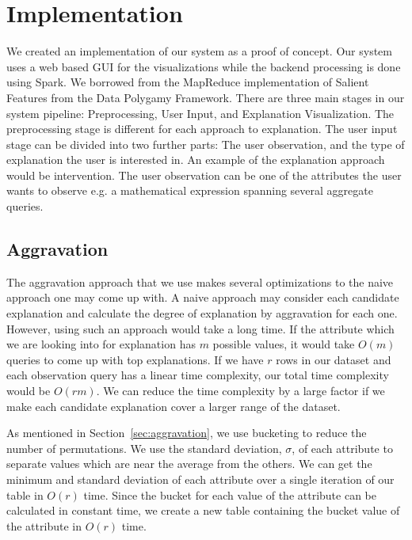 \chapter{Implementation}
\label{sec:implementation}
We created an implementation of our system as a proof of concept. Our system uses a web based GUI for the visualizations while the backend processing is done using Spark\citep{shanahan2015large}. We borrowed from the MapReduce implementation of Salient Features from the Data Polygamy Framework\citep{chirigati2016data}. There are three main stages in our system pipeline: Preprocessing, User Input, and Explanation Visualization. The preprocessing stage is different for each approach to explanation. The user input stage can be divided into two further parts: The user observation, and the type of explanation the user is interested in. An example of the explanation approach would be intervention. The user observation can be one of the attributes the user wants to observe e.g. a mathematical expression spanning several aggregate queries.

\section{Aggravation}
\label{aggravation_impl}
The aggravation approach that we use makes several optimizations to the naive approach one may come up with. A naive approach may consider each candidate explanation and calculate the degree of explanation by aggravation for each one. However, using such an approach would take a long time. If the attribute which we are looking into for explanation has $m$ possible values, it would take $O(m)$ queries to come up with top explanations. If we have $r$ rows in our dataset and each observation query has a linear time complexity, our total time complexity would be $O(rm)$. We can reduce the time complexity by a large factor if we make each candidate explanation cover a larger range of the dataset.

As mentioned in Section~\ref{sec:aggravation}, we use bucketing to reduce the number of permutations. We use the standard deviation, $\sigma$, of each attribute to separate values which are near the average from the others. We can get the minimum and standard deviation of each attribute over a single iteration of our table in $O(r)$ time. Since the bucket for each value of the attribute can be calculated in constant time, we create a new table containing the bucket value of the attribute in $O(r)$ time.

